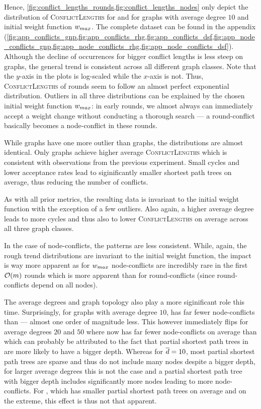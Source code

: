 Hence, \cref{fig:conflict_lengths_rounds,fig:conflict_lengths_nodes} only depict the distribution of \textsc{ConflictLengths} for \algsp and \algbp for graphs with average degree $10$ and initial weight function $w_{max}$.
The complete dataset can be found in the appendix (\cref{fig:app_conflicts_gnp,fig:app_conflicts_rhg,fig:app_conflicts_dsf,fig:app_node_conflicts_gnp,fig:app_node_conflicts_rhg,fig:app_node_conflicts_dsf}).
Although the decline of occurrences for bigger conflict lengths is less steep on \rhg graphs, the general trend is consistent across all different graph classes.
Note that the $y$-axis in the plots is log-scaled while the $x$-axis is not.
Thus, \textsc{ConflictLengths} of rounds seem to follow an almost perfect exponential distribution.
Outliers in all three distributions can be explained by the chosen initial weight function $w_{max}$: in early rounds, we almost always can immediately accept a weight change without conducting a thorough search --- a round-conflict basically becomes a node-conflict in these rounds.

While \gnp graphs have one more outlier than \dsf graphs, the distributions are almost identical.
Only \rhg graphs achieve higher average \textsc{ConflictLengths} which is consistent with observations from the previous experiment.
Small cycles and lower acceptance rates lead to siginificantly smaller shortest path trees on average, thus reducing the number of conflicts.

As with all prior metrics, the resulting data is invariant to the initial weight function with the exception of a few outliers.
Also again, a higher average degree leads to more cycles and thus also to lower \textsc{ConflictLengths} on average across all three graph classes.

\medskip

In the case of node-conflicts, the patterns are less consistent.
While, again, the rough trend distributions are invariant to the initial weight function, the impact is way more apparent as for $w_{max}$ node-conflicts are incredibly rare in the first $\mathcal O\!\left(m\right)$ rounds which is more apparent than for round-conflicts (since round-conflicts depend on all nodes). 

The average degrees and graph topology also play a more siginificant role this time.
Surprisingly, for \gnp graphs with average degree $10$, \algsp has far fewer node-conflicts than \algbp --- almost one order of magnitude less.
This however immediately flips for average degrees $20$ and $50$ where \algbp now has far fewer node-conflicts on average than \algsp which can probably be attributed to the fact that partial shortest path trees in \algsp are more likely to have a bigger depth.
Whereas for $\overline{d} = 10$, most partial shortest path trees are sparse and thus do not include many nodes despite a bigger depth, for larger average degrees this is not the case and a partial shortest path tree with bigger depth includes significantly more nodes leading to more node-conflicts.
For \algbp, which has smaller partial shortest path trees on average and on the extreme, this effect is thus not that apparent.

